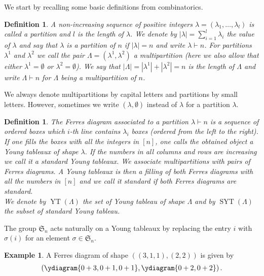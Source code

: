 \documentclass[11pt,a4paper]{amsart}
\numberwithin{equation}{section}
\newtheorem{definition}[thm]{Definition}
\theoremstyle{definition}
\newtheorem{example}[thm]{Example}
\DeclareMathOperator{\SYT}{SYT}
\DeclareMathOperator{\YT}{YT}
\numberwithin{thm}{section}
\theoremstyle{break}
\numberwithin{subcase}{case}
\begin{document}
We start by recalling some basic definitions from combinatorics. 
\begin{definition}
A non-increasing sequence of positive integers $\lambda = (\lambda_1,\ldots,\lambda_l)$ is called a partition and $l$ is the length of $\lambda$. We denote by $|\lambda| = \sum_{i=1}^l \lambda_i$ the value of $\lambda$ and say that $\lambda$ is a partition of $n$ if $|\lambda| = n$ and write $\lambda \vdash n$. For partitions $\lambda^1$ and $\lambda^2$ we call the pair $\Lambda = (\lambda^1,\lambda^2)$ a multipartition (here we also allow that either $\lambda^1 = \emptyset $ or $\lambda^2 = \emptyset$). We say that $|\Lambda| = |\lambda^1|+|\lambda^2| =n$ is the length of $\Lambda$ and write $\Lambda \vdash n$ for $\Lambda$ being a multipartition of $n$.  
\end{definition}
We always denote multipartitions by capital letters and partitions by small letters. However, sometimes we write $(\lambda,\emptyset)$ instead of $\lambda$ for a partition $\lambda$. 
\begin{definition}
The Ferres diagram associated to a partition $\lambda \vdash n$ is a sequence of ordered boxes which $i$-th line contains $\lambda_i$ boxes (ordered from the left to the right). If one fills the boxes with all the integers in $[n]$, one calls the obtained object a Young tableaux of shape $\lambda$. If the numbers in all columns and rows are increasing we call it a standard Young tableaux. We associate multipartitions with pairs of Ferres diagrams. A Young tableaux is then a filling of both Ferres diagrams with all the numbers in $[n]$ and we call it standard if both Ferres diagrams are standard. \\ 
We denote by $\YT (\Lambda)$ the set of Young tableau of shape $\Lambda$ and by $\SYT (\Lambda)$ the subset of standard Young tableau. 
\end{definition}
The group $\mathfrak{S}_n$ acts naturally on a Young tableaux by replacing the entry $i$ with $\sigma (i)$ for an element $\sigma \in \mathfrak{S}_n$.
\begin{example}
A Ferres diagram of shape $((3,1,1),(2,2))$ is given by \begin{align*} \left(
    \ydiagram{0+3,0+1,0+1}, \ydiagram{0+2,0+2} \right).
\end{align*} 
\end{example}
\end{document}
